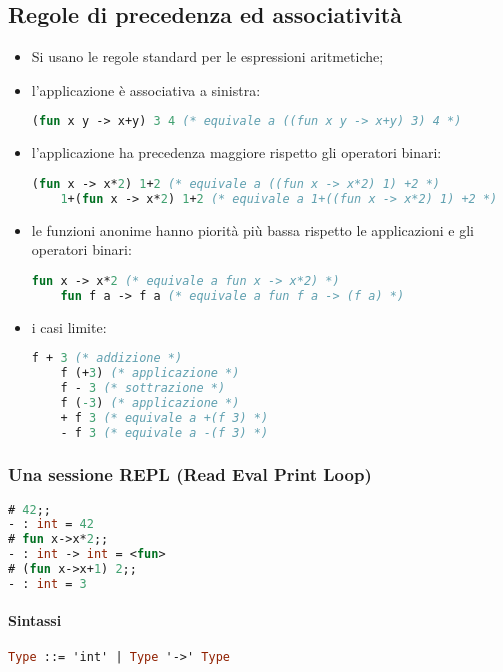 \subsection{Regole di precedenza ed associatività}
\begin{itemize}
  \item Si usano le regole standard per le espressioni aritmetiche;
  \item l'applicazione è associativa a sinistra:
    \begin{lstlisting}[language=Caml, caption={Esempio di associatività}]
    (fun x y -> x+y) 3 4 (* equivale a ((fun x y -> x+y) 3) 4 *)
    \end{lstlisting}
  \item l'applicazione ha precedenza maggiore rispetto gli operatori binari:
    \begin{lstlisting}[language=Caml, caption={Esempio di precedenza}]
    (fun x -> x*2) 1+2 (* equivale a ((fun x -> x*2) 1) +2 *)
    1+(fun x -> x*2) 1+2 (* equivale a 1+((fun x -> x*2) 1) +2 *)
    \end{lstlisting}
  \item le funzioni anonime hanno piorità più bassa rispetto le applicazioni
    e gli operatori binari:
    \begin{lstlisting}[language=Caml, caption={Esempio di precedenza}]
    fun x -> x*2 (* equivale a fun x -> x*2) *)
    fun f a -> f a (* equivale a fun f a -> (f a) *)
    \end{lstlisting}
  \item i casi limite:
    \begin{lstlisting}[language=Caml, caption={Casi limite di precedenza}]
    f + 3 (* addizione *)
    f (+3) (* applicazione *)
    f - 3 (* sottrazione *)
    f (-3) (* applicazione *)
    + f 3 (* equivale a +(f 3) *)
    - f 3 (* equivale a -(f 3) *)
    \end{lstlisting}
\end{itemize}

\subsubsection{Una sessione REPL (Read Eval Print Loop)}
\begin{lstlisting}[language=Caml, caption={I tipi possono essere inferiti dall'interprete}]
# 42;;
- : int = 42
# fun x->x*2;;
- : int -> int = <fun>
# (fun x->x+1) 2;;
- : int = 3
\end{lstlisting}

\paragraph{Sintassi}
\begin{lstlisting}[language=Caml, caption={Grammatica BNF}]
Type ::= 'int' | Type '->' Type
\end{lstlisting}

